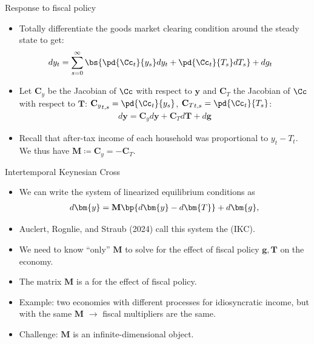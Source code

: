 \documentclass[11pt,xcolor={dvipsnames},aspectratio=159,hyperref={pdftex,pdfpagemode=UseNone,hidelinks,pdfdisplaydoctitle=true},usepdftitle=false]{beamer}
\begin{document}
   \begin{frame}{Response to fiscal policy}
    \begin{itemize}
   
    \item Totally differentiate the goods market clearing condition around the steady state to get: \begin{align*}
        dy_t  & = \sum_{s=0}^\infty  \bs{\pd{ \Cc_t}{y_s} dy_t + \pd{ \Cc_t}{T_s} dT_s }+ dg_t
    \end{align*}
   \item  Let ${\mathbf{C}}_y$ be the Jacobian of $\Cc$ with respect to $\bm{y}$ and $\mathbf{C}_T$ the Jacobian of $\Cc$ with respect to $\bm{T}$: ${\mathbf{C}_y}_{t,s}  = \pd{\Cc_t}{y_s}$, ${\mathbf{C}_T}_{t,s}  = \pd{\Cc_t}{T_s}$:
    \begin{align*}
        d\bm{y} = \mathbf{C}_y d\bm{y} + \mathbf{C}_T d\bm{T} + d\bm{g}
    \end{align*}
    \item Recall that after-tax income of each household was proportional to $y_t - T_t$. We thus have  $\mathbf{M}\coloneqq \mathbf{C}_y = - \mathbf{C}_T$. \end{itemize}
   \end{frame}

\begin{frame}{Intertemporal Keynesian Cross}
    \begin{itemize}
    \item We can write the system of linearized equilibrium conditions as \begin{align*}
        d\bm{y} = \mathbf{M} \bp{d\bm{y} - d\bm{T}} + d\bm{g},
    \end{align*}
    \item Auclert, Rognlie, and Straub (2024) call this system the  (IKC).
    \item We need to know ``only'' $\mathbf{M}$ to solve for the effect of fiscal policy $\bm{g},\bm{T}$ on the economy.
    \item The matrix $\mathbf{M}$ is a  for the effect of fiscal policy.
    \item Example: two economies with different processes for idiosyncratic income, but with the same $\mathbf{M}$ $\rightarrow$ fiscal multipliers are the same.
    \item Challenge: $\mathbf{M}$ is an infinite-dimensional object.
    \end{itemize}
\end{frame}
\end{document}
